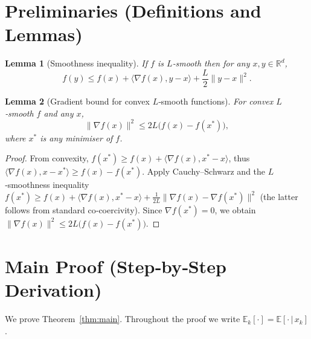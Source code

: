 \documentclass{article}
\newtheorem{lemma}{Lemma}
\begin{document}
\newpage

\section*{Preliminaries (Definitions and Lemmas)}
\begin{lemma}[Smoothness inequality]\label{lem:smooth}
If $f$ is $L$‑smooth then for any $x,y\in\mathbb{R}^{d}$,
\[
f(y)\le f(x)+\langle\nabla f(x),y-x\rangle+\frac{L}{2}\|y-x\|^{2}.
\]
\end{lemma}
\begin{lemma}[Gradient bound for convex $L$‑smooth functions]\label{lem:gradbound}
For convex $L$‑smooth $f$ and any $x$,
\[
\|\nabla f(x)\|^{2}\le 2L\big(f(x)-f(x^{*})\big),
\]
where $x^{*}$ is any minimiser of $f$.
\end{lemma}
\begin{proof}
From convexity,
$f(x^{*})\ge f(x)+\langle\nabla f(x),x^{*}-x\rangle$,
thus $\langle\nabla f(x),x-x^{*}\rangle\ge f(x)-f(x^{*})$.
Apply Cauchy–Schwarz and the $L$‑smoothness inequality
$f(x^{*})\ge f(x)+\langle\nabla f(x),x^{*}-x\rangle+\frac{1}{2L}\|\nabla f(x)-\nabla f(x^{*})\|^{2}$
(the latter follows from standard co‑coercivity). Since $\nabla f(x^{*})=0$, we obtain
$\|\nabla f(x)\|^{2}\le 2L\big(f(x)-f(x^{*})\big)$.
\end{proof}

\section*{Main Proof (Step‑by‑Step Derivation)}
We prove Theorem~\ref{thm:main}. Throughout the proof we write $\mathbb{E}_k[\cdot]=\mathbb{E}[\cdot\,|\,x_k]$.
\end{document}
